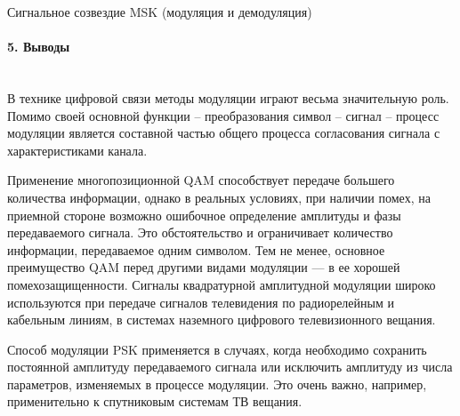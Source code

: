 \documentclass[12pt,a4paper]{report}
\begin{document}
Сигнальное созвездие MSK (модуляция и демодуляция)

\begin{figure}[h!]
\end{figure}

\paragraph{5. Выводы \\\\}
В технике цифровой связи методы модуляции играют весьма значительную роль. Помимо своей основной функции – преобразования символ – сигнал – процесс модуляции является составной частью общего процесса согласования сигнала с характеристиками канала.

Применение многопозиционной QAM способствует передаче большего количества информации, однако в реальных усло­виях, при наличии помех, на приемной стороне возможно ошибочное определение амплитуды и фазы передаваемого сигнала. Это обстоя­тельство и ограничивает количество информации, передаваемое од­ним символом. Тем не менее, основное преимущество QAM перед другими видами модуляции — в ее хорошей помехозащищенности. Сигналы квадратурной амплитудной модуляции широко используются при передаче сигналов телевидения по радиорелейным и кабельным линиям, в системах наземного цифрового телевизионного вещания.

Способ модуляции PSK применяется в случаях, когда необхо­димо сохранить постоянной амплитуду передаваемого сигнала или исключить амплитуду из числа параметров, изменяемых в процессе модуляции. Это очень важно, например, применительно к спутниковым системам ТВ вещания.
\end{document}
